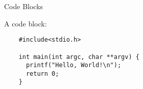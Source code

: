 \begin{frame}[fragile]{Code Blocks}
  \begin{example}[codeblock]
    A code block:
    \begin{verbatim}
    #include<stdio.h>

    int main(int argc, char **argv) {
      printf("Hello, World!\n");
      return 0;
    }
    \end{verbatim}
  \end{example}
\end{frame}




